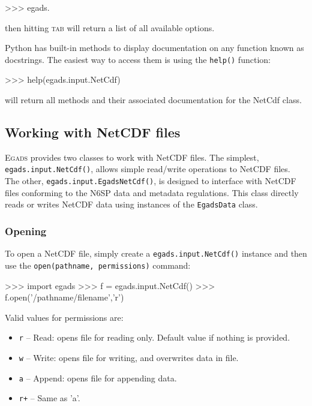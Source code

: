 \documentclass[a4paper,11pt]{report}
\newcommand{\Egads}{\textsc{Egads} }
\begin{document}
\begin{command}
    >>> egads.
\end{command}
then hitting \textsc{tab} will return a list of all available options. 

Python has built-in methods to display documentation on any function known as docstrings. The easiest way to access them is using the \verb|help()| function:

\begin{command}
   >>> help(egads.input.NetCdf)
\end{command}
will return all methods and their associated documentation for the NetCdf class.

\subsection{Working with NetCDF files}

\Egads provides two classes to work with NetCDF files. The simplest, \verb|egads.input.NetCdf()|, allows simple read/write operations to NetCDF files. The other, \verb|egads.input.EgadsNetCdf()|, is designed to interface with NetCDF files conforming to the N6SP data and metadata regulations. This class directly reads or writes NetCDF data using instances of the \verb|EgadsData| class.

\subsubsection{Opening}

To open a NetCDF file, simply create a \verb|egads.input.NetCdf()| instance and then use the \verb|open(pathname, permissions)| command:

\begin{command}
    >>> import egads
    >>> f = egads.input.NetCdf()
    >>> f.open('/pathname/filename','r')
\end{command}
%
Valid values for permissions are:

\begin{itemize}
 \item \verb|r| -- Read: opens file for reading only. Default value if nothing is provided.
 \item \verb|w| -- Write: opens file for writing, and overwrites data in file.
 \item \verb|a| -- Append: opens file for appending data.
 \item \verb|r+| -- Same as 'a'.
\end{itemize}
\end{document}
